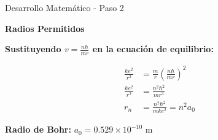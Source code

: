 \documentclass[12pt,aspectratio=169]{beamer}
\begin{document}
\begin{frame}{Desarrollo Matemático - Paso 2}
    \begin{center}
        \huge \textbf{Radios Permitidos}
    \end{center}
    
    \vspace{1cm}
    \begin{center}
        \Large \textbf{Sustituyendo $v = \frac{n\hbar}{mr}$ en la ecuación de equilibrio:}
    \end{center}
    
    \vspace{1cm}
    \begin{align}
        \frac{ke^2}{r^2} &= \frac{m}{r}\left(\frac{n\hbar}{mr}\right)^2 \\[0.8cm]
        \frac{ke^2}{r^2} &= \frac{n^2\hbar^2}{mr^3} \\[0.8cm]
        r_n &= \frac{n^2\hbar^2}{mke^2} = n^2 a_0
    \end{align}
    
    \vspace{1cm}
    \begin{center}
        \colorbox{verdeclaro!20}{\parbox{0.8\textwidth}{
            \begin{center}
                \LARGE \textbf{Radio de Bohr:} $a_0 = 0.529 \times 10^{-10}$ m
            \end{center}
        }}
    \end{center}
\end{frame}
\end{document}
